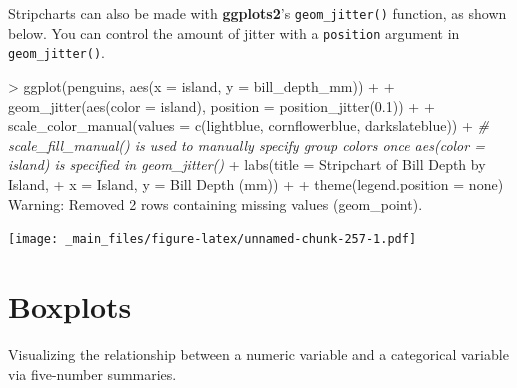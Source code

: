\documentclass[
]{book}
\newenvironment{Shaded}{\begin{snugshade}}{\end{snugshade}}
\newcommand{\AttributeTok}[1]{\textcolor[rgb]{0.77,0.63,0.00}{#1}}
\newcommand{\CommentTok}[1]{\textcolor[rgb]{0.56,0.35,0.01}{\textit{#1}}}
\newcommand{\DecValTok}[1]{\textcolor[rgb]{0.00,0.00,0.81}{#1}}
\newcommand{\FloatTok}[1]{\textcolor[rgb]{0.00,0.00,0.81}{#1}}
\newcommand{\FunctionTok}[1]{\textcolor[rgb]{0.00,0.00,0.00}{#1}}
\newcommand{\NormalTok}[1]{#1}
\newcommand{\SpecialCharTok}[1]{\textcolor[rgb]{0.00,0.00,0.00}{#1}}
\newcommand{\StringTok}[1]{\textcolor[rgb]{0.31,0.60,0.02}{#1}}
\begin{document}
Stripcharts can also be made with \textbf{ggplots2}'s \texttt{geom\_jitter()} function, as shown below. You can control the amount of jitter with a \texttt{position} argument in \texttt{geom\_jitter()}.

\begin{Shaded}
\begin{Highlighting}[]
\SpecialCharTok{\textgreater{}} \FunctionTok{ggplot}\NormalTok{(penguins, }\FunctionTok{aes}\NormalTok{(}\AttributeTok{x =}\NormalTok{ island, }\AttributeTok{y =}\NormalTok{ bill\_depth\_mm)) }\SpecialCharTok{+}
\SpecialCharTok{+}   \FunctionTok{geom\_jitter}\NormalTok{(}\FunctionTok{aes}\NormalTok{(}\AttributeTok{color =}\NormalTok{ island), }\AttributeTok{position =} \FunctionTok{position\_jitter}\NormalTok{(}\FloatTok{0.1}\NormalTok{)) }\SpecialCharTok{+}
\SpecialCharTok{+}   \FunctionTok{scale\_color\_manual}\NormalTok{(}\AttributeTok{values =} \FunctionTok{c}\NormalTok{(}\StringTok{\textquotesingle{}lightblue\textquotesingle{}}\NormalTok{, }\StringTok{\textquotesingle{}cornflowerblue\textquotesingle{}}\NormalTok{, }\StringTok{\textquotesingle{}darkslateblue\textquotesingle{}}\NormalTok{)) }\SpecialCharTok{+} \CommentTok{\# scale\_fill\_manual() is used to manually specify group colors once aes(color = island) is specified in \textasciigrave{}geom\_jitter()\textasciigrave{}}
\SpecialCharTok{+}   \FunctionTok{labs}\NormalTok{(}\AttributeTok{title =} \StringTok{\textquotesingle{}Stripchart of Bill Depth by Island\textquotesingle{}}\NormalTok{, }
\SpecialCharTok{+}        \AttributeTok{x =} \StringTok{\textquotesingle{}Island\textquotesingle{}}\NormalTok{, }\AttributeTok{y =} \StringTok{\textquotesingle{}Bill Depth (mm)\textquotesingle{}}\NormalTok{) }\SpecialCharTok{+}
\SpecialCharTok{+}   \FunctionTok{theme}\NormalTok{(}\AttributeTok{legend.position =} \StringTok{\textquotesingle{}none\textquotesingle{}}\NormalTok{)}
\NormalTok{Warning}\SpecialCharTok{:}\NormalTok{ Removed }\DecValTok{2}\NormalTok{ rows containing missing }\FunctionTok{values}\NormalTok{ (geom\_point).}
\end{Highlighting}
\end{Shaded}

\texttt{[image: \_main\_files/figure-latex/unnamed-chunk-257-1.pdf]}

\hypertarget{boxplots}{%
\section{Boxplots}\label{boxplots}}

Visualizing the relationship between a numeric variable and a categorical variable via five-number summaries.
\end{document}
